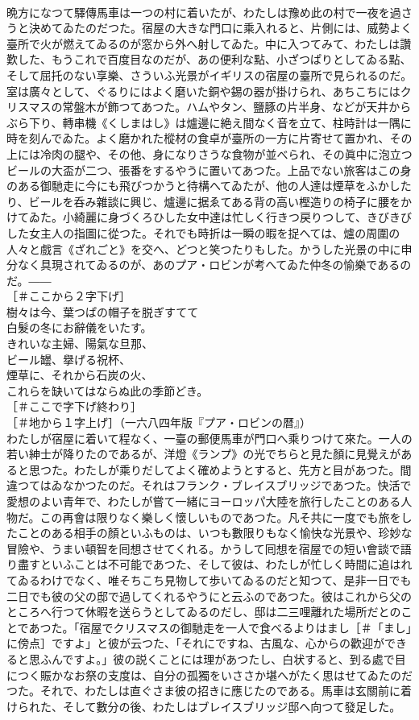 \documentclass[8pt]{extreport}
\begin{document}
\begin{CJK}{UTF8}{min}
\\	晩方になつて驛傳馬車は一つの村に着いたが、わたしは豫め此の村で一夜を過さうと決めてゐたのだつた。宿屋の大きな門口に乘入れると、片側には、威勢よく臺所で火が燃えてゐるのが窓から外へ射してゐた。中に入つてみて、わたしは讚歎した、もうこれで百度目なのだが、あの便利な點、小ざつぱりとしてゐる點、そして屈托のない享樂、さういふ光景がイギリスの宿屋の臺所で見られるのだ。室は廣々として、ぐるりにはよく磨いた銅や錫の器が掛けられ、あちこちにはクリスマスの常盤木が飾つてあつた。ハムやタン、鹽豚の片半身、などが天井からぶら下り、轉串機《くしまはし》は爐邊に絶え間なく音を立て、柱時計は一隅に時を刻んでゐた。よく磨かれた樅材の食卓が臺所の一方に片寄せて置かれ、その上には冷肉の腿や、その他、身になりさうな食物が並べられ、その眞中に泡立つビールの大盃が二つ、張番をするやうに置いてあつた。上品でない旅客はこの身のある御馳走に今にも飛びつかうと待構へてゐたが、他の人達は煙草をふかしたり、ビールを呑み雜談に興じ、爐邊に据ゑてある背の高い樫造りの椅子に腰をかけてゐた。小綺麗に身づくろひした女中達は忙しく行きつ戻りつして、きびきびした女主人の指圖に從つた。それでも時折は一瞬の暇を捉へては、爐の周圍の人々と戲言《ざれごと》を交へ、どつと笑つたりもした。かうした光景の中に申分なく具現されてゐるのが、あのプア・ロビンが考へてゐた仲冬の愉樂であるのだ。――
\\	［＃ここから２字下げ］
\\	樹々は今、葉つぱの帽子を脱ぎすてて
\\	白髮の冬にお辭儀をいたす。
\\	きれいな主婦、陽氣な旦那、
\\	ビール罎、擧げる祝杯、
\\	煙草に、それから石炭の火、
\\	これらを缺いてはならぬ此の季節どき。
\\	［＃ここで字下げ終わり］
\\	［＃地から１字上げ］（一六八四年版『プア・ロビンの暦』）
\\	わたしが宿屋に着いて程なく、一臺の郵便馬車が門口へ乘りつけて來た。一人の若い紳士が降りたのであるが、洋燈《ランプ》の光でちらと見た顏に見覺えがあると思つた。わたしが乘りだしてよく確めようとすると、先方と目があつた。間違つてはゐなかつたのだ。それはフランク・ブレイスブリッジであつた。快活で愛想のよい青年で、わたしが嘗て一緒にヨーロッパ大陸を旅行したことのある人物だ。この再會は限りなく樂しく懷しいものであつた。凡そ共に一度でも旅をしたことのある相手の顏といふものは、いつも數限りもなく愉快な光景や、珍妙な冒險や、うまい頓智を囘想させてくれる。かうして囘想を宿屋での短い會談で語り盡すといふことは不可能であつた、そして彼は、わたしが忙しく時間に追はれてゐるわけでなく、唯そちこち見物して歩いてゐるのだと知つて、是非一日でも二日でも彼の父の邸で過してくれるやうにと云ふのであつた。彼はこれから父のところへ行つて休暇を送らうとしてゐるのだし、邸は二三哩離れた場所だとのことであつた。「宿屋でクリスマスの御馳走を一人で食べるよりはまし［＃「まし」に傍点］ですよ」と彼が云つた、「それにですね、古風な、心からの歡迎ができると思ふんですよ。」彼の説くことには理があつたし、白状すると、到る處で目につく賑かなお祭の支度は、自分の孤獨をいささか堪へがたく思はせてゐたのだつた。それで、わたしは直ぐさま彼の招きに應じたのである。馬車は玄關前に着けられた、そして數分の後、わたしはブレイスブリッジ邸へ向つて發足した。

\end{CJK}
\end{document}

